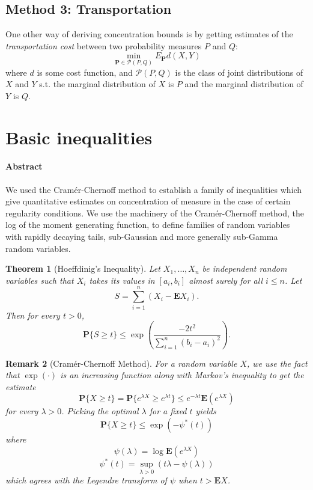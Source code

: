 \documentclass{amsproc}
\newtheorem{theorem}{Theorem}
\newtheorem{remark}[theorem]{Remark}
\begin{document}
	\subsection*{Method 3: Transportation}

	One other way of deriving concentration bounds is by getting estimates of the \textit{transportation cost} between two probability measures $P$ and $Q$:
	\[
		\min_{\mathbf{P}\in\mathcal{P}(P,Q)}E_\mathbf{P}d(X,Y)
	\]
	where $d$ is some cost function, and $\mathcal{P}(P,Q)$ is the class of joint distributions of $X$ and $Y$ s.t. the marginal distribution of $X$ is $P$ and the marginal distribution of $Y$ is $Q$.


\section{Basic inequalities}
\label{sec:basic_inequalites}
\paragraph{\textbf{Abstract}}
We used the Cram\'{e}r-Chernoff method to establish a family of inequalities which give quantitative estimates on concentration of measure in the case of certain regularity conditions. We use the machinery of the Cram\'{e}r-Chernoff method, the log of the moment generating function, to define families of random variables with rapidly decaying tails, sub-Gaussian and more generally sub-Gamma random variables.

\begin{theorem}[Hoeffdinig's Inequality]
\label{thm:hoeffding}
Let $X_1, \dots, X_n$ be independent random variables such that $X_i$ takes its values in $[a_i, b_i]$ almost surely for all $i \leq n$. Let
\[S = \sum_{i=1}^n (X_i - \mathbf{E}X_i).\]
Then for every $t > 0$,
\[\mathbf{P} \{S \geq t \} \leq  \exp \left( \frac{-2t^2}{\sum_{i=1}^n (b_i-a_i)^2} \right).\]
\end{theorem}

\begin{remark}[Cram\'{e}r-Chernoff Method]
\label{rmk:cramer-chernoff}
For a random variable $X$, we use the fact that $\exp(\cdot)$ is an increasing function along with Markov's inequality to get the estimate
\[\mathbf{P} \{X \geq t \} = \mathbf{P} \{e^{\lambda X} \geq e^{\lambda t} \} \leq e^{-\lambda t} \mathbf{E}\left( e^{\lambda X} \right)\]
for every $\lambda > 0$.
Picking the optimal $\lambda$ for a fixed $t$ yields
\[\mathbf{P} \{X \geq t \} \leq \exp \left( -\psi^*(t) \right) \]
where 
\[\psi(\lambda) = \log \mathbf{E}\left( e^{\lambda X} \right)\]
\[\psi^*(t) = \sup_{\lambda > 0} \left( t \lambda - \psi(\lambda) \right) \]
which agrees with the Legendre transform of $\psi$ when $t > \mathbf{E}X$.
\end{remark}
\end{document}
